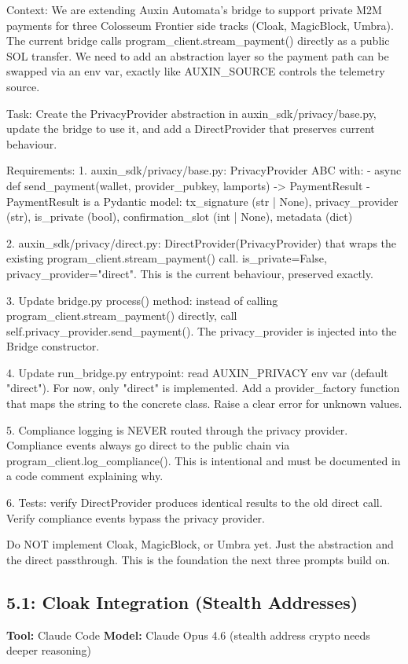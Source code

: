 \documentclass[11pt, a4paper]{article}
\begin{document}
\begin{promptbox}
Context: We are extending Auxin Automata's bridge to support private M2M payments for three Colosseum Frontier side tracks (Cloak, MagicBlock, Umbra). The current bridge calls program_client.stream_payment() directly as a public SOL transfer. We need to add an abstraction layer so the payment path can be swapped via an env var, exactly like AUXIN_SOURCE controls the telemetry source.

Task: Create the PrivacyProvider abstraction in auxin_sdk/privacy/base.py, update the bridge to use it, and add a DirectProvider that preserves current behaviour.

Requirements:
1. auxin_sdk/privacy/base.py: PrivacyProvider ABC with:
   - async def send_payment(wallet, provider_pubkey, lamports) -> PaymentResult
   - PaymentResult is a Pydantic model: tx_signature (str | None), privacy_provider (str), is_private (bool), confirmation_slot (int | None), metadata (dict)

2. auxin_sdk/privacy/direct.py: DirectProvider(PrivacyProvider) that wraps the existing program_client.stream_payment() call. is_private=False, privacy_provider="direct". This is the current behaviour, preserved exactly.

3. Update bridge.py process() method: instead of calling program_client.stream_payment() directly, call self.privacy_provider.send_payment(). The privacy_provider is injected into the Bridge constructor.

4. Update run_bridge.py entrypoint: read AUXIN_PRIVACY env var (default "direct"). For now, only "direct" is implemented. Add a provider_factory function that maps the string to the concrete class. Raise a clear error for unknown values.

5. Compliance logging is NEVER routed through the privacy provider. Compliance events always go direct to the public chain via program_client.log_compliance(). This is intentional and must be documented in a code comment explaining why.

6. Tests: verify DirectProvider produces identical results to the old direct call. Verify compliance events bypass the privacy provider.

Do NOT implement Cloak, MagicBlock, or Umbra yet. Just the abstraction and the direct passthrough. This is the foundation the next three prompts build on.
\end{promptbox}

\subsection*{5.1: Cloak Integration (Stealth Addresses)}
\textbf{Tool:} Claude Code \quad \textbf{Model:} Claude Opus 4.6 (stealth address crypto needs deeper reasoning)
\end{document}
